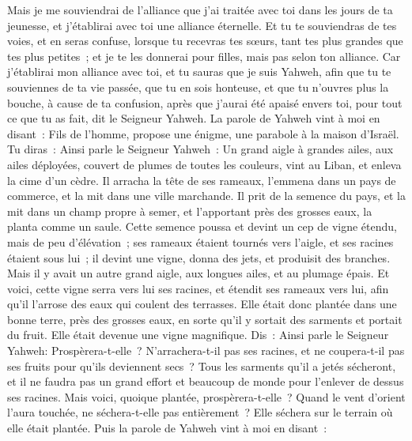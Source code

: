 \begin{multicols}{2}
Mais je me souviendrai de l'alliance que j'ai traitée avec toi dans les jours de ta jeunesse, et j'établirai avec toi une alliance éternelle.
Et tu te souviendras de tes voies, et en seras confuse, lorsque tu recevras tes sœurs, tant tes plus grandes que tes plus petites~; et je te les donnerai pour filles, mais pas selon ton alliance.
Car j'établirai mon alliance avec toi, et tu sauras que je suis Yahweh,
afin que tu te souviennes de ta vie passée, que tu en sois honteuse, et que tu n'ouvres plus la bouche, à cause de ta confusion, après que j'aurai été apaisé envers toi, pour tout ce que tu as fait, dit le Seigneur Yahweh.
\VerseOne{}La parole de Yahweh vint à moi en disant~:
Fils de l'homme, propose une énigme, une parabole à la maison d'Israël.
Tu diras~: Ainsi parle le Seigneur Yahweh~: Un grand aigle à grandes ailes, aux ailes déployées, couvert de plumes de toutes les couleurs, vint au Liban, et enleva la cime d'un cèdre.
Il arracha la tête de ses rameaux, l'emmena dans un pays de commerce, et la mit dans une ville marchande.
Il prit de la semence du pays, et la mit dans un champ propre à semer, et l'apportant près des grosses eaux, la planta comme un saule.
Cette semence poussa et devint un cep de vigne étendu, mais de peu d'élévation~; ses rameaux étaient tournés vers l'aigle, et ses racines étaient sous lui~; il devint une vigne, donna des jets, et produisit des branches.
Mais il y avait un autre grand aigle, aux longues ailes, et au plumage épais. Et voici, cette vigne serra vers lui ses racines, et étendit ses rameaux vers lui, afin qu'il l'arrose des eaux qui coulent des terrasses.
Elle était donc plantée dans une bonne terre, près des grosses eaux, en sorte qu'il y sortait des sarments et portait du fruit. Elle était devenue une vigne magnifique.
Dis~: Ainsi parle le Seigneur Yahweh: Prospèrera-t-elle~? N'arrachera-t-il pas ses racines, et ne coupera-t-il pas ses fruits pour qu'ils deviennent secs~? Tous les sarments qu'il a jetés sécheront, et il ne faudra pas un grand effort et beaucoup de monde pour l'enlever de dessus ses racines.
Mais voici, quoique plantée, prospèrera-t-elle~? Quand le vent d'orient l'aura touchée, ne séchera-t-elle pas entièrement~? Elle séchera sur le terrain où elle était plantée.
Puis la parole de Yahweh vint à moi en disant~:

\end{multicols}
